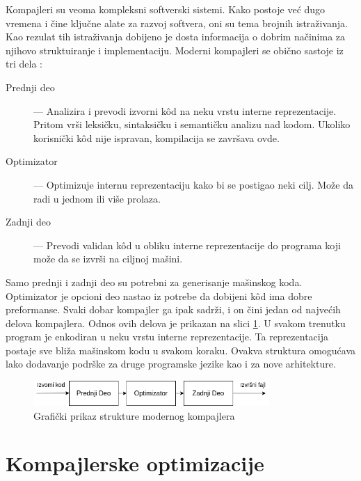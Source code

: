 \documentclass[12pt,oneside]{memoir}
\begin{document}
Kompajleri su veoma kompleksni softverski sistemi.
Kako postoje već dugo vremena i čine ključne alate za razvoj softvera, oni su tema brojnih istraživanja.
Kao rezulat tih istraživanja dobijeno je dosta informacija o dobrim načinima za njihovo struktuiranje i implementaciju.
Moderni kompajleri se obično sastoje iz tri dela \cite{cooper2022engineering}:
\begin{description}
  \item[Prednji deo] --- Analizira i prevodi izvorni k\^od na neku vrstu interne reprezentacije. Pritom vrši leksičku, sintaksičku i semantičku analizu nad kodom. Ukoliko korisnički k\^od nije ispravan, kompilacija se završava ovde.
  \item[Optimizator] --- Optimizuje internu reprezentaciju kako bi se postigao neki cilj. Može da radi u jednom ili više prolaza.
  \item[Zadnji deo] --- Prevodi validan k\^od u obliku interne reprezentacije do programa koji može da se izvrši na ciljnoj mašini.
\end{description}
Samo prednji i zadnji deo su potrebni za generisanje mašinskog koda.
Optimizator je opcioni deo nastao iz potrebe da dobijeni k\^od ima dobre preformanse.
Svaki dobar kompajler ga ipak sadrži, i on čini jedan od najvećih delova kompajlera.
Odnos ovih delova je prikazan na slici \ref{fig:compiler_structure}.
U svakom trenutku program je enkodiran u neku vrstu interne reprezentacije.
Ta reprezentacija postaje sve bliža mašinskom kodu u svakom koraku.
Ovakva struktura omogućava lako dodavanje podrške za druge programske jezike kao i za nove arhitekture.

\begin{figure}[!ht]
  \centering
  \includegraphics[width=0.8\textwidth]{assets/compiler_structure.png}
  \caption{Grafički prikaz strukture modernog kompajlera}
  \label{fig:compiler_structure}
\end{figure}

\section{Kompajlerske optimizacije}

\end{document}
